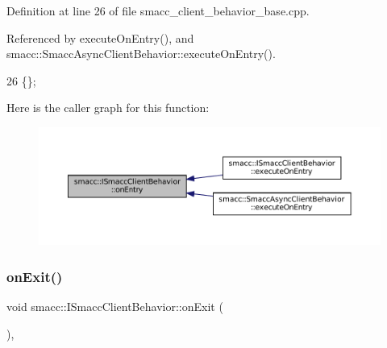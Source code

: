 Definition at line 26 of file smacc\+\_\+client\+\_\+behavior\+\_\+base.\+cpp.



Referenced by execute\+On\+Entry(), and smacc\+::\+Smacc\+Async\+Client\+Behavior\+::execute\+On\+Entry().


\begin{DoxyCode}
26 \{\};
\end{DoxyCode}
Here is the caller graph for this function\+:
\nopagebreak
\begin{figure}[H]
\begin{center}
\leavevmode
\includegraphics[width=350pt]{classsmacc_1_1ISmaccClientBehavior_a9877684b1954429719826e2d0924d980_icgraph}
\end{center}
\end{figure}
\mbox{\label{classsmacc_1_1ISmaccClientBehavior_ad1198fdb2cbdf11f3276d3e23d4c0a50}} 
\subsubsection{\texorpdfstring{on\+Exit()}{onExit()}}
{\footnotesize\ttfamily void smacc\+::\+I\+Smacc\+Client\+Behavior\+::on\+Exit (\begin{DoxyParamCaption}{ }\end{DoxyParamCaption})\hspace{0.3cm}{\ttfamily [protected]}, {\ttfamily [virtual]}}



